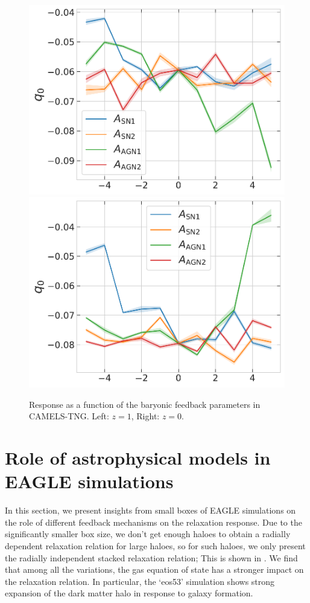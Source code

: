 \begin{figure}[htbp]
\centering
\includegraphics[width=0.49\linewidth]{plots/CAMELS_I_q0_sn18.pdf}
\includegraphics[width=0.49\linewidth]{plots/CAMELS_I_q0_sn33.pdf}
\caption[]{Response as a function of the baryonic feedback parameters in CAMELS-TNG. Left: $z=1$, Right: $z=0$.}
\label{fig:camels-q0q1}
\end{figure}









\section{Role of astrophysical models in EAGLE simulations}
\label{sec:res-physvar-eagle}
In this section, we present insights from small boxes of EAGLE simulations on the role of different feedback mechanisms on the relaxation response.
Due to the significantly smaller box size, we don't get enough haloes to obtain a radially dependent relaxation relation for large haloes, so for such haloes, we only present the radially independent stacked relaxation relation; This is shown in . We find that among all the variations, the gas equation of state has a stronger impact on the relaxation relation. In particular, the `eos53' simulation shows strong expansion of the dark matter halo in response to galaxy formation.

